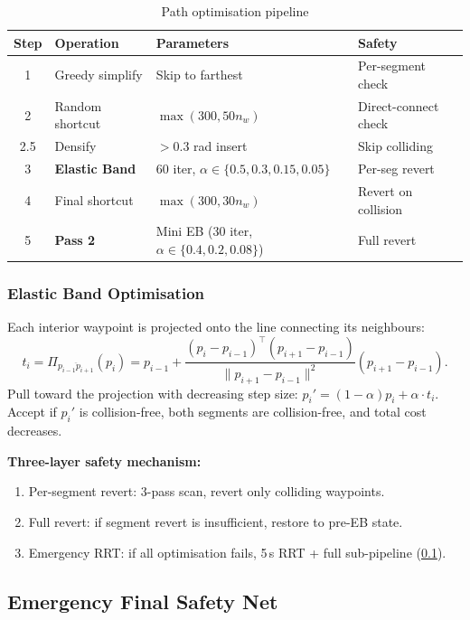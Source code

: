 \documentclass[journal]{IEEEtran}
\begin{document}
\begin{table}[ht]
\centering
\caption{Path optimisation pipeline}
\label{tab:pipeline}
\begin{tabular}{@{}clll@{}}
\toprule
\textbf{Step} & \textbf{Operation} & \textbf{Parameters}
  & \textbf{Safety} \\
\midrule
1 & Greedy simplify & Skip to farthest & Per-segment check \\
2 & Random shortcut & $\max(300, 50 n_w)$ & Direct-connect check \\
2.5 & Densify & $> 0.3$ rad insert & Skip colliding \\
3 & \textbf{Elastic Band} & 60 iter,
  $\alpha \in \{0.5, 0.3, 0.15, 0.05\}$ & Per-seg revert \\
4 & Final shortcut & $\max(300, 30 n_w)$ & Revert on collision \\
5 & \textbf{Pass 2} & Mini EB (30 iter,
  $\alpha \in \{0.4, 0.2, 0.08\}$) & Full revert \\
\bottomrule
\end{tabular}
\end{table}

\subsubsection{Elastic Band Optimisation}

Each interior waypoint is projected onto the line connecting its
neighbours:
\begin{equation}
  t_i = \Pi_{\overline{p_{i-1}p_{i+1}}}(p_i)
  = p_{i-1} + \frac{(p_i - p_{i-1})^\top (p_{i+1} - p_{i-1})}
  {\|p_{i+1} - p_{i-1}\|^2} (p_{i+1} - p_{i-1}).
\end{equation}
Pull toward the projection with decreasing step size:
$p_i' = (1-\alpha) p_i + \alpha \cdot t_i$.
Accept if $p_i'$ is collision-free, both segments are collision-free,
and total cost decreases.

\textbf{Three-layer safety mechanism:}
\begin{enumerate}[nosep]
  \item Per-segment revert: 3-pass scan, revert only colliding waypoints.
  \item Full revert: if segment revert is insufficient, restore to
    pre-EB state.
  \item Emergency RRT: if all optimisation fails, 5\,s RRT + full
    sub-pipeline (\cref{sec:emergency}).
\end{enumerate}

\subsection{Emergency Final Safety Net}\label{sec:emergency}
\end{document}
